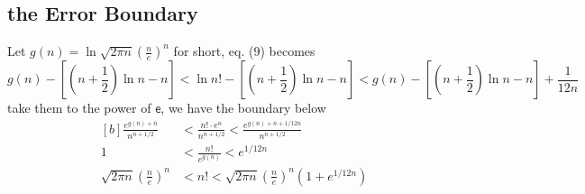 \documentclass[11pt]{article}
\begin{document}
\subsection{\normalsize the Error Boundary}

Let $\displaystyle g(n) = \ln  \sqrt{2 \pi n}  \left( \frac{n}{e} \right) ^n$ for short,  eq. (9) becomes
$$
g(n) - \left[ \left(n + \frac{1}{2} \right) \ln n - n \right] <  \ln n! - \left[ \left(n + \frac{1}{2} \right) \ln n - n \right] < g(n) - \left[ \left(n + \frac{1}{2} \right) \ln n - n \right] + \frac{1}{12n}
$$
take them to the power of $\mathsf{e}$,  we have the boundary below
$$
\begin{aligned}[b]
\frac{e ^ {g(n) + n } }{n ^ {n + 1/2} } &< \frac{n! \cdot e^n}{n ^ {n + 1/2} } < \frac{e ^ {g(n) + n + 1/12n} }{n ^ {n + 1/2} }  \\
1 &< \frac{n!}{e^{g(n)} } < e ^{1/12n} \\
\sqrt{2 \pi n}  \left( \frac{n}{e} \right) ^n &< n! <  \sqrt{2 \pi n}  \left( \frac{n}{e} \right) ^n \left(1+ e ^{1/12n} \right) \\
\end{aligned}
$$






\printbibliography [title={Reference}]


\end{document}
